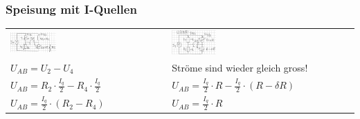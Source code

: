 \subsubsection{Speisung mit I-Quellen}
\begin{tabular}{ll}
\includegraphics[width=0.3\textwidth]{pics/wheatstone/i_quelle} & \includegraphics[width=0.25\textwidth]{pics/wheatstone/i_quelle_2}\\
$U_{AB} = U_2 - U_4$ & Ströme sind wieder gleich gross!\\
$U_{AB} = R_2 \cdot \frac{I_q}{2} - R_4 \cdot \frac{I_q}{2}$ & $U_{AB} = \frac{I_q}{2} \cdot R - \frac{I_q}{2} \cdot (R- \delta R)$\\
$U_{AB} = \frac{I_q}{2} \cdot (R_2 - R_4)$ & $U_{AB} = \frac{I_q}{2} \cdot R $\\
\end{tabular}
